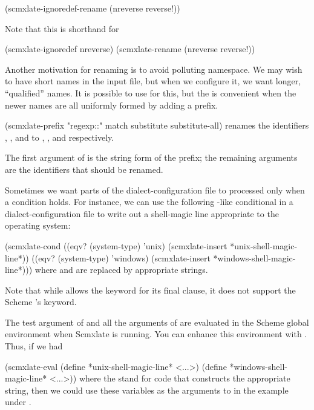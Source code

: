 \begintts
(scmxlate-ignoredef-rename
  (nreverse reverse!))
\endtt

Note that this is shorthand for

\begintts
(scmxlate-ignoredef nreverse)
(scmxlate-rename
  (nreverse reverse!))
\endtt


Another motivation for renaming is to avoid polluting
namespace.  We may wish to have short names in the
input file, but when we configure it, we want longer,
“qualified” names.  It is possible to use
 for this, but the
 is convenient when the newer names
are all uniformly formed by adding a prefix.

\begintts
(scmxlate-prefix
  "regexp::"
  match
  substitute
  substitute-all)
\endtt
renames the identifiers , ,
and  to
, , and
 respectively.

The first argument of  is the
string form of the prefix; the remaining arguments are
the identifiers that should be renamed.


Sometimes we want parts of the dialect-configuration
file to processed only when a condition holds.  For
instance, we can use the following -like
conditional in
a dialect-configuration file to
write out a  shell-magic
line appropriate to the operating system:

\begintts
(scmxlate-cond
  ((eqv? (system-type) 'unix)
   (scmxlate-insert *unix-shell-magic-line*))
  ((eqv? (system-type) 'windows)
   (scmxlate-insert *windows-shell-magic-line*)))
\endtt
where  and
 are replaced by
appropriate strings.

Note that while  allows the 
keyword for its final clause, it does not support the
Scheme ’s \q{=>} keyword.


The test argument of  and all the
arguments of  are evaluated in the
Scheme global environment when Scmxlate is running.
You can enhance this environment with
.  Thus, if we had

\begintts
(scmxlate-eval
  (define *unix-shell-magic-line* <...>)
  (define *windows-shell-magic-line* <...>))
\endtt
where the  stand for code that constructs
the appropriate string, then we could use these
variables as the arguments to  in
the example under .

